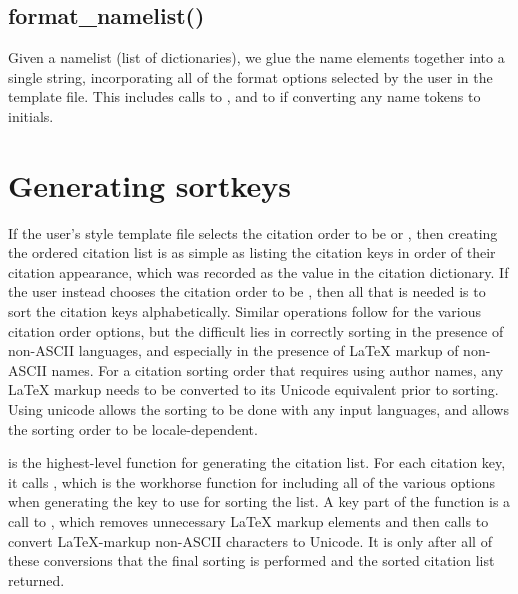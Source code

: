 \documentclass[letterpaper,10pt,english]{sphinxmanual}
\begin{document}
\subsection{format\_namelist()}
\label{developer_guide:format-namelist}
Given a namelist (list of dictionaries), we glue the name elements together into a single string, incorporating all of the format options selected by the user in the template file. This includes calls to , and to  if converting any name tokens to initials.


\section{Generating sortkeys}
\label{developer_guide:generating-sortkeys}
If the user's style template file selects the citation order to be  or , then creating the ordered citation list is as simple as listing the citation keys in order of their citation appearance, which was recorded as the value in the citation dictionary. If the user instead chooses the citation order to be , then all that is needed is to sort the citation keys alphabetically. Similar operations follow for the various citation order options, but the difficult lies in correctly sorting in the presence of non-ASCII languages, and especially in the presence of LaTeX markup of non-ASCII names. For a citation sorting order that requires using author names, any LaTeX markup needs to be converted to its Unicode equivalent prior to sorting. Using unicode allows the sorting to be done with any input languages, and allows the sorting order to be locale-dependent.

 is the highest-level function for generating the citation list. For each citation key, it calls , which is the workhorse function for including all of the various options when generating the key to use for sorting the list. A key part of the function is a call to , which removes unnecessary LaTeX markup elements and then calls  to convert LaTeX-markup non-ASCII characters to Unicode. It is only after all of these conversions that the final sorting is performed and the sorted citation list returned.
\end{document}
